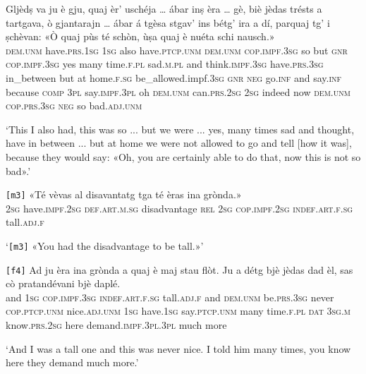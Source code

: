 \begin{linenumbers}
	\gll Gljèdṣ va ju è gju, quaj èr’ uschéja … ábar inṣ èra … gè,  biè jèdas trésts a tartgava, ò gjantarajn … ábar á tgèsa stgav’ ins bétg’ ira a dí, parquaj tg’ i ṣchèvan: «Ò quaj pùs té schòn, ùṣa quaj è nuéta schi nausch.»\\
	\textsc{dem.unm} have.\textsc{prs.1sg} \textsc{1sg} also have.\textsc{ptcp.unm} \textsc{dem.unm} \textsc{cop.impf.3sg} so {} but \textsc{gnr} \textsc{cop.impf.3sg} {} yes many time.\textsc{f.pl} sad.\textsc{m.pl} and think.\textsc{impf.3sg} have.\textsc{prs.3sg} in\_between {} but at home.\textsc{f.sg} be\_allowed.impf.\textsc{3sg} \textsc{gnr} \textsc{neg} go.\textsc{inf} and say.\textsc{inf} because \textsc{comp} \textsc{3pl} say.\textsc{impf.3pl} oh \textsc{dem.unm} can.\textsc{prs.2sg} \textsc{2sg} indeed now \textsc{dem.unm} \textsc{cop.prs.3sg} \textsc{neg} so bad.\textsc{adj.unm}\\
\end{linenumbers}
\medskip
\glt `This I also had, this was so ... but we were ... yes, many times sad and thought, have in between ... but at home we were not allowed to go and tell [how it was], because they would say: «Oh, you are certainly able to do that, now this is not so bad».'
\medskip

\begin{linenumbers}
	\gll  \texttt{[m3]} «Té vèvas al disavantatg tga té èras ina grònda.» \\
	{} \textsc{2sg} have.\textsc{impf.2sg} \textsc{def.art.m.sg} disadvantage \textsc{rel} \textsc{2sg} \textsc{cop.impf.2sg} \textsc{indef.art.f.sg} tall.\textsc{adj.f} \\
\end{linenumbers}
\medskip
\glt `\texttt{[m3]} «You had the disadvantage to be tall.»'
\medskip

\begin{linenumbers}
	\gll \texttt{[f4]} Ad ju èra ina grònda a quaj è maj stau flòt. Ju a détg bjè jèdas dad èl, sas cò pratandévani bjè daplé.\\
{} and \textsc{1sg} \textsc{cop.impf.3sg} \textsc{indef.art.f.sg} tall.\textsc{adj.f} and \textsc{dem.unm} be.\textsc{prs.3sg} never \textsc{cop.ptcp.unm} nice.\textsc{adj.unm} \textsc{1sg} have.\textsc{1sg} say.\textsc{ptcp.unm} many time.\textsc{f.pl} \textsc{dat} \textsc{3sg.m} know.\textsc{prs.2sg} here demand.\textsc{impf.3pl.3pl} much more\\
\end{linenumbers}
\medskip
\glt `And I was a tall one and this was never nice. I told him many times, you know here they demand much more.'
\medskip

